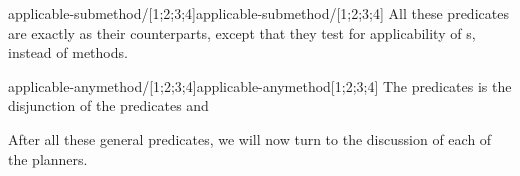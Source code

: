 \begin{predicate}{applicable-submethod/[1;2;3;4]}{applicable-submethod/[1;2;3;4]}%
All these predicates are exactly as their 
counterparts, except that they test for applicability of
s, instead of methods. 
\end{predicate}

\begin{predicate}{applicable-anymethod/[1;2;3;4]}{applicable-anymethod[1;2;3;4]}%
The predicates  is the disjunction of the
predicates  and 
\end{predicate}

After all these general predicates, we will now turn to the discussion
of each of the planners. 

